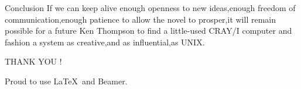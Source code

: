 \documentclass[CJK]{beamer}
\begin{document}
\begin{CJK*}{UTF8}{gbsn}
\begin{frame}{Conclusion}
If we can keep alive  enough openness to new ideas,enough freedom of communication,enough patience to allow the novel to prosper,it will remain possible for a future Ken Thompson to find a little-used CRAY/I computer and  fashion a system as creative,and as influential,as UNIX. 
\end{frame}

\begin{frame}
	\begin{center}
	{\LARGE THANK YOU !}
	\end{center}
	\begin{block}{}
	\begin{center}
	{\small Proud to use \LaTeX\ and Beamer.}
	\end{center}
	\end{block}
\end{frame}
\end{CJK*}
\end{document}
